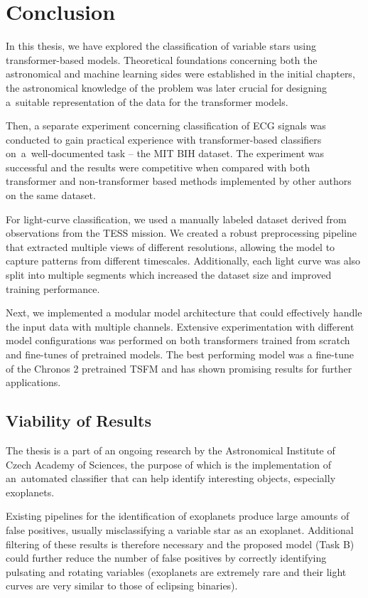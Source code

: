 \chapter{Conclusion}

In this thesis, we have explored the classification of variable stars using \linebreak transformer-based models.
Theoretical foundations concerning both the astronomical and machine learning sides were established in the initial chapters, the astronomical knowledge of the problem was later crucial for designing a~suitable representation of the data for the transformer models.

Then, a separate experiment concerning classification of ECG signals was conducted to gain practical experience with transformer-based classifiers \linebreak on~a~well-documented task -- the MIT BIH dataset.
The experiment was successful and the results were competitive when compared with both transformer and non-transformer based methods implemented by other authors on the same dataset.

For light-curve classification, we used a manually labeled dataset derived from observations from the TESS mission.
We created a robust preprocessing pipeline that extracted multiple views of different resolutions, allowing the model to capture patterns from different timescales.
Additionally, each light curve was also split into multiple segments which increased the dataset size and improved training performance.

Next, we implemented a modular model architecture that could effectively handle the input data with multiple channels.
Extensive experimentation with different model configurations was performed on both transformers trained from scratch and fine-tunes of pretrained models.
The best performing model was a fine-tune of the Chronos 2 pretrained TSFM and has shown promising results for further applications.

\section{Viability of Results}

The thesis is a part of an ongoing research by the Astronomical Institute of Czech Academy of Sciences, the purpose of which is the implementation of an~automated classifier that can help identify interesting objects, especially exoplanets.

Existing pipelines for the identification of exoplanets produce large amounts of false positives, usually misclassifying a variable star as an exoplanet.
Additional filtering of these results is therefore necessary and the proposed model (Task B) could further reduce the number of false positives by correctly identifying pulsating and rotating variables (exoplanets are extremely rare and their light curves are very similar to those of eclipsing binaries).

